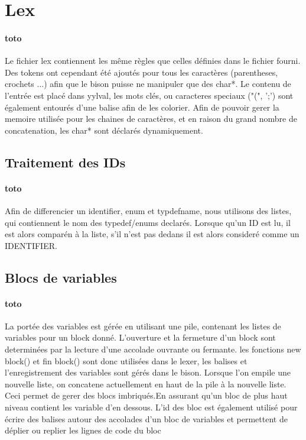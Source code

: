 \documentclass{report}
\begin{document}
	\section{Lex}{
	\paragraph{toto}{
		Le fichier lex contiennent les même règles que celles définies dans le fichier fourni. Des tokens ont cependant été ajoutés pour tous les caractères (parentheses, crochets ...) afin 
		que le bison puisse ne manipuler que des char*. Le contenu de l'entrée est placé dans yylval, les mots clés, ou caracteres speciaux ("(", ';') sont également entourés d'une balise
		afin de les colorier. Afin de pouvoir gerer la memoire utilisée pour les chaines de caractères, et en raison du grand nombre de concatenation, les char* sont déclarés dynamiquement.
		}
		\subsection{Traitement des IDs}{	
	\paragraph{toto}{
	Afin de differencier un identifier, enum et typdefname, nous utilisons des listes, qui contiennent le nom des typedef/enums declarés. Lorsque qu'un ID est lu, il est alors comparén à
			 la liste, s'il n'est pas dedans il est alors consideré comme un IDENTIFIER.
			 }
		}
		\subsection{Blocs de variables}{
		\paragraph{toto}{
		La portée des variables est gérée en utilisant une pile, contenant les listes de variables pour un block donné. L'ouverture et la fermeture d'un block sont determinées par la lecture d'une accolade ouvrante ou fermante. les fonctions new block() et fin block() sont donc utilisées dans le lexer, les balises et l'enregistrement des variables sont gérés dans le bison. Lorsque l'on empile une nouvelle liste, on concatene actuellement en haut de la pile à la nouvelle liste. Ceci permet de gerer des blocs imbriqués.En assurant qu'un bloc de plus haut niveau contient les variable d'en dessous.
L'id des bloc est également utilisé pour écrire des balises autour des accolades d'un bloc de variables et permettent de déplier ou replier les lignes de code du bloc
			}
			}
}
\end{document}
